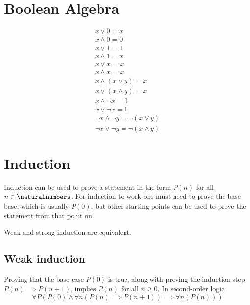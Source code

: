 \documentclass[a4paper]{article}
\author{Paolo Bettelini}
\date{}
\begin{document}
\maketitle
\tableofcontents
\pagebreak

\section{Boolean Algebra}


\begin{align*}
    x \lor 0 = x \\
    x \land 0 = 0 \\
    x \lor 1 = 1 \\
    x \land 1 = x \\
    x \lor x = x \\
    x \land x = x \\
    x \land (x \lor y) = x \\
    x \lor (x \land y) = x \\
    x \land \lnot x = 0 \\
    x \lor \lnot x = 1 \\
    \lnot x \land \lnot y = \lnot (x \lor y) \\
    \lnot x \lor \lnot y = \lnot (x \land y)
\end{align*}

\pagebreak

\section{Induction}

Induction can be used to prove a statement in the form \(P(n)\)
for all \(n \in \naturalnumbers\).
For induction to work one must need to prove the base base, which is usually \(P(0)\),
but other starting points can be used to prove the statement from that point on.

Weak and strong induction are equivalent.

\subsection{Weak induction}

Proving that the base case \(P(0)\) is true,
along with proving the induction step \(P(n) \implies P(n+1)\), implies \(P(n)\)
for all \(n \geq 0\). In second-order logic
\[
    \forall P \left(
        P(0) \land \forall n \left( P(n) \implies P(n+1) \right)
        \implies \forall n \left( P(n) \right)
    \right)
\]
\end{document}
